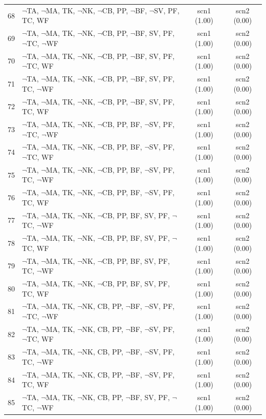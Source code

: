 \documentclass[12pt]{article}
\begin{document}
\begin{longtable}{|l|l|c|c|}
68 & $\neg$TA, $\neg$MA, TK, $\neg$NK, $\neg$CB, PP, $\neg$BF, $\neg$SV, PF, TC, WF & scn1 (1.00) & scn2 (0.00)\\
69 & $\neg$TA, $\neg$MA, TK, $\neg$NK, $\neg$CB, PP, $\neg$BF, SV, PF, $\neg$TC, $\neg$WF & scn1 (1.00) & scn2 (0.00)\\
70 & $\neg$TA, $\neg$MA, TK, $\neg$NK, $\neg$CB, PP, $\neg$BF, SV, PF, $\neg$TC, WF & scn1 (1.00) & scn2 (0.00)\\
71 & $\neg$TA, $\neg$MA, TK, $\neg$NK, $\neg$CB, PP, $\neg$BF, SV, PF, TC, $\neg$WF & scn1 (1.00) & scn2 (0.00)\\
72 & $\neg$TA, $\neg$MA, TK, $\neg$NK, $\neg$CB, PP, $\neg$BF, SV, PF, TC, WF & scn1 (1.00) & scn2 (0.00)\\
73 & $\neg$TA, $\neg$MA, TK, $\neg$NK, $\neg$CB, PP, BF, $\neg$SV, PF, $\neg$TC, $\neg$WF & scn1 (1.00) & scn2 (0.00)\\
74 & $\neg$TA, $\neg$MA, TK, $\neg$NK, $\neg$CB, PP, BF, $\neg$SV, PF, $\neg$TC, WF & scn1 (1.00) & scn2 (0.00)\\
75 & $\neg$TA, $\neg$MA, TK, $\neg$NK, $\neg$CB, PP, BF, $\neg$SV, PF, TC, $\neg$WF & scn1 (1.00) & scn2 (0.00)\\
76 & $\neg$TA, $\neg$MA, TK, $\neg$NK, $\neg$CB, PP, BF, $\neg$SV, PF, TC, WF & scn1 (1.00) & scn2 (0.00)\\
77 & $\neg$TA, $\neg$MA, TK, $\neg$NK, $\neg$CB, PP, BF, SV, PF, $\neg$TC, $\neg$WF & scn1 (1.00) & scn2 (0.00)\\
78 & $\neg$TA, $\neg$MA, TK, $\neg$NK, $\neg$CB, PP, BF, SV, PF, $\neg$TC, WF & scn1 (1.00) & scn2 (0.00)\\
79 & $\neg$TA, $\neg$MA, TK, $\neg$NK, $\neg$CB, PP, BF, SV, PF, TC, $\neg$WF & scn1 (1.00) & scn2 (0.00)\\
80 & $\neg$TA, $\neg$MA, TK, $\neg$NK, $\neg$CB, PP, BF, SV, PF, TC, WF & scn1 (1.00) & scn2 (0.00)\\
81 & $\neg$TA, $\neg$MA, TK, $\neg$NK, CB, PP, $\neg$BF, $\neg$SV, PF, $\neg$TC, $\neg$WF & scn1 (1.00) & scn2 (0.00)\\
82 & $\neg$TA, $\neg$MA, TK, $\neg$NK, CB, PP, $\neg$BF, $\neg$SV, PF, $\neg$TC, WF & scn1 (1.00) & scn2 (0.00)\\
83 & $\neg$TA, $\neg$MA, TK, $\neg$NK, CB, PP, $\neg$BF, $\neg$SV, PF, TC, $\neg$WF & scn1 (1.00) & scn2 (0.00)\\
84 & $\neg$TA, $\neg$MA, TK, $\neg$NK, CB, PP, $\neg$BF, $\neg$SV, PF, TC, WF & scn1 (1.00) & scn2 (0.00)\\
85 & $\neg$TA, $\neg$MA, TK, $\neg$NK, CB, PP, $\neg$BF, SV, PF, $\neg$TC, $\neg$WF & scn1 (1.00) & scn2 (0.00)\\

\end{longtable}
\end{document}
